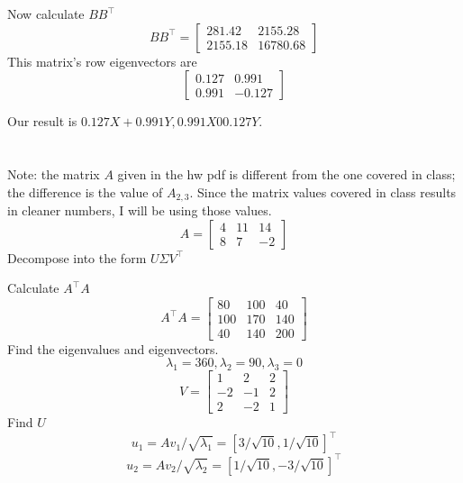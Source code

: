 \documentclass[12pt]{article}
\begin{document}
Now calculate $ BB^\intercal $
\[BB^\intercal = 
\begin{bmatrix}
	281.42 & 2155.28\\
	2155.18 & 16780.68
\end{bmatrix}
\]
This matrix's row eigenvectors are 
\[\begin{bmatrix}
	0.127 & 0.991\\
	0.991 & -0.127
\end{bmatrix}\]

Our result is $ 0.127X + 0.991Y, 0.991X 0 0.127Y $.

\newpage

\section{} %
Note: the matrix $ A $ given in the hw pdf is different from the one covered in class; the difference is the value of $ A_{2,3} $. Since the matrix values covered in class results in cleaner numbers, I will be using those values.
\[A=
\begin{bmatrix}
	4 & 11 & 14\\
	8 & 7 & -2
\end{bmatrix}
\]
Decompose into the form $ U \Sigma V^\intercal $

Calculate $ A^\intercal A $
\[A^\intercal A =
\begin{bmatrix}
	80 & 100 & 40\\
	100 & 170 & 140\\
	40 & 140 & 200
\end{bmatrix}\]
Find the eigenvalues and eigenvectors. 
\[\lambda_1 = 360, \lambda_2 = 90, \lambda_3 = 0\]
\[V = 
\begin{bmatrix}
	1 & 2 & 2\\
	-2 & -1 & 2\\
	2 & -2 & 1
\end{bmatrix}\]
Find $ U $
\[ u_1 = A v_1/\sqrt{\lambda_1} = [3/\sqrt{10}, 1/\sqrt{10}]^\intercal \]
\[ u_2 = A v_2/\sqrt{\lambda_2} = [1/\sqrt{10}, -3/\sqrt{10}]^\intercal \]
\end{document}

